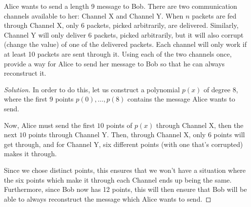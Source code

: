 \documentclass{article}
\newenvironment{solution}{\begin{proof}[Solution]}{\end{proof}}
\begin{document}
\begin{hw}
	Alice wants to send a length 9 message to Bob. There are two communication channels available to her: Channel X and Channel Y. When $n$ packets are fed through Channel X, only 6 packets, picked arbitrarily, are delivered. Similarly, Channel Y will only deliver 6 packets, picked arbitrarily, but it will also corrupt (change the value) of one of the delivered packets. Each channel will only work if at least 10 packets are sent through it. Using each of the two channels once, provide a way for Alice to send her message to Bob so that he can always reconstruct it. 
\end{hw}
\begin{solution}
	In order to do this, let us construct a polynomial $p(x)$ of degree 8, where the first $9$ points $p(0), \ldots, p(8)$ contains the message Alice wants to send.
	
	Now, Alice must send the first $10$ points of $p(x)$ through Channel X, then the next $10$ points through Channel Y. Then, through Channel X, only $6$ points will get through, and for Channel Y, six different points (with one that's corrupted) makes it through.
	
	Since we chose distinct points, this ensures that we won't have a situation where the six points which make it through each Channel ends up being the same. Furthermore, since Bob now has 12 points, this will then ensure that Bob will be able to always reconstruct the message which Alice wants to send.
\end{solution}
\end{document}
